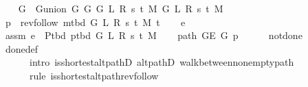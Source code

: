 \begin{isabellebody}
%
\isatagproof
{}\isamarkupfalse%
\isanewline
\ \ \isamarkupfalse%
\ {\isacharquery}{\kern0pt}G\ {\isacharequal}{\kern0pt}\ {\isachardoublequoteopen}G{\isachardot}{\kern0pt}union\ {\isacharparenleft}{\kern0pt}G{}\ G\ {\isacharparenleft}{\kern0pt}G{}\ L\ R\ s\ t\ M{\isacharparenright}{\kern0pt}{\isacharparenright}{\kern0pt}\ {\isacharparenleft}{\kern0pt}G{}\ L\ R\ s\ t\ M{\isacharparenright}{\kern0pt}{\isachardoublequoteclose}\isanewline
\ \ \isamarkupfalse%
\ {\isacharquery}{\kern0pt}p\ {\isacharequal}{\kern0pt}\ {\isachardoublequoteopen}rev{\isacharunderscore}{\kern0pt}follow\ {\isacharparenleft}{\kern0pt}m{\isacharunderscore}{\kern0pt}tbd\ G\ L\ R\ s\ t\ M{\isacharparenright}{\kern0pt}\ t{\isachardoublequoteclose}\isanewline
\ \ \isamarkupfalse%
\ e\isanewline
\ \ \isamarkupfalse%
\ assm{\isacharcolon}{\kern0pt}\ {\isachardoublequoteopen}e\ {\isasymin}\ P{\isacharunderscore}{\kern0pt}tbd\ {\isacharparenleft}{\kern0pt}p{\isacharunderscore}{\kern0pt}tbd\ G\ L\ R\ s\ t\ M{\isacharparenright}{\kern0pt}{\isachardoublequoteclose}\isanewline
\ \ \isamarkupfalse%
\ {\isachardoublequoteopen}path\ {\isacharparenleft}{\kern0pt}G{\isachardot}{\kern0pt}E\ {\isacharquery}{\kern0pt}G{\isacharparenright}{\kern0pt}\ {\isacharquery}{\kern0pt}p{\isachardoublequoteclose}\isanewline
\ \ \ \ \isamarkupfalse%
\ not{\isacharunderscore}{\kern0pt}done{\isacharunderscore}{\kern0pt}{}\isanewline
\ \ \ \ \isamarkupfalse%
\ done{\isacharunderscore}{\kern0pt}{}{\isacharunderscore}{\kern0pt}def\isanewline
\ \ \ \ \isamarkupfalse%
\isanewline
\ \ \ \ \ \ {\isacharparenleft}{\kern0pt}intro\ is{\isacharunderscore}{\kern0pt}shortest{\isacharunderscore}{\kern0pt}alt{\isacharunderscore}{\kern0pt}pathD{\isacharparenleft}{\kern0pt}{}{\isacharparenright}{\kern0pt}\ alt{\isacharunderscore}{\kern0pt}pathD{\isacharparenleft}{\kern0pt}{}{\isacharparenright}{\kern0pt}\ walk{\isacharunderscore}{\kern0pt}between{\isacharunderscore}{\kern0pt}nonempty{\isacharunderscore}{\kern0pt}path{\isacharparenleft}{\kern0pt}{}{\isacharparenright}{\kern0pt}{\isacharparenright}{\kern0pt}\isanewline
\ \ \ \ \ \ {\isacharparenleft}{\kern0pt}rule\ is{\isacharunderscore}{\kern0pt}shortest{\isacharunderscore}{\kern0pt}alt{\isacharunderscore}{\kern0pt}path{\isacharunderscore}{\kern0pt}rev{\isacharunderscore}{\kern0pt}follow{\isacharparenright}{\kern0pt}\isanewline
\ \ \isamarkupfalse%

\end{isabellebody}
